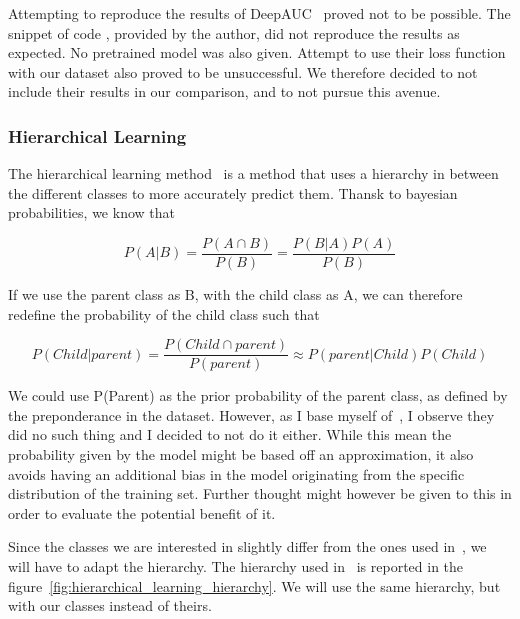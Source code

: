 \documentclass[11pt]{article}
\begin{document}
            Attempting to reproduce the results of DeepAUC~\cite{DeepAUC} proved not to be possible. The snippet of code , provided by the author,
            did not reproduce the results as expected. No pretrained model was also given. Attempt to use their loss function with our dataset also proved
            to be unsuccessful. We therefore decided to not include their results in our comparison, and to not pursue this avenue.

        \subsubsection{Hierarchical Learning~\cite{hierarchical}}

            The hierarchical learning method~\cite{hierarchical} is a method that uses a hierarchy in between the different classes
            to more accurately predict them. Thansk to bayesian probabilities, we know that

            \begin{equation}
                P(A|B) = \frac{P(A \cap B)}{P(B)} = \frac{P(B|A) P(A)}{P(B)}
            \end{equation}

            If we use the parent class as B, with the child class as A, we can therefore redefine
            the probability of the child class such that

            \begin{equation}
                P(Child|parent) = \frac{P(Child \cap parent)}{P(parent)} \approx P(parent|Child) P(Child)
            \end{equation}

            We could use P(Parent) as the prior probability of the parent class, as defined by the preponderance in the dataset. However, as I base myself of~\cite{hierarchical}, I observe they did no such thing and I decided to not do it either. While this mean the probability given by the model might be based off an approximation,
            it also avoids having an additional bias in the model originating from the specific distribution of the training set. Further thought might however be given to this in order to evaluate the potential benefit of it.

            Since the classes we are interested in slightly differ from the ones used in~\cite{hierarchical},
            we will have to adapt the hierarchy. The hierarchy used in~\cite{hierarchical} is reported in the figure~\ref{fig:hierarchical_learning_hierarchy}. We will use the same hierarchy, but with our classes instead of theirs.
\end{document}
